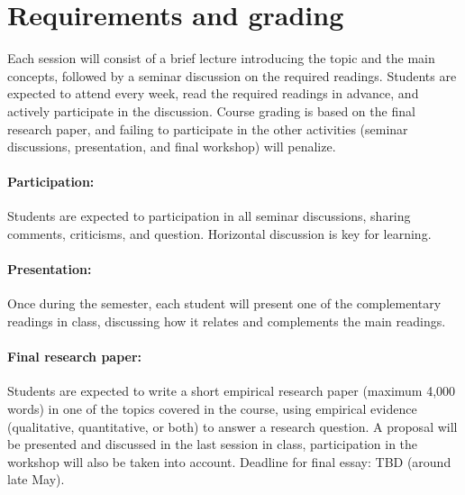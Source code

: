 \documentclass[12pt, a4paper]{article}
\begin{document}
\section{Requirements and grading}

Each session will consist of a brief lecture introducing the topic and the main concepts, followed by a seminar discussion on the required readings. Students are expected to attend every week, read the required readings in advance, and actively participate in the discussion. Course grading is based on the final research paper, and failing to participate in the other activities (seminar discussions, presentation, and final workshop) will penalize.

\paragraph{Participation:} Students are expected to participation in all seminar discussions, sharing comments, criticisms, and question. Horizontal discussion is key for learning. %

\vspace{-5pt}\paragraph{Presentation:} Once during the semester, each student will present one of the complementary readings in class, discussing how it relates and complements the main readings.


\vspace{-5pt}\paragraph{Final research paper:} Students are expected to write a short empirical research paper (maximum 4,000 words) in one of the topics covered in the course, using empirical evidence (qualitative, quantitative, or both) to answer a research question. A proposal will be presented and discussed in the last session in class, participation in the workshop will also be taken into account. Deadline for final essay: TBD (around late May).
\end{document}
